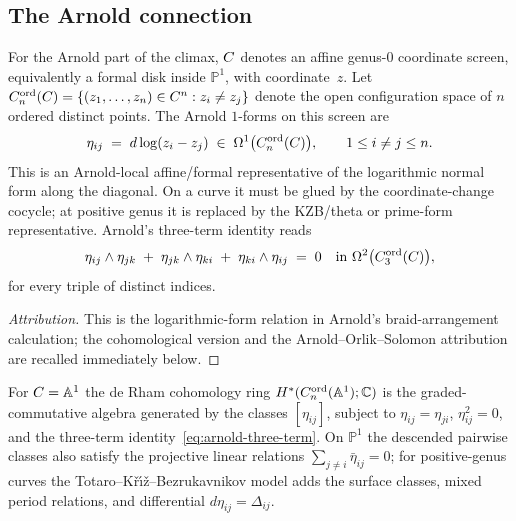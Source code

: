 \subsection{The Arnold connection}
\label{ssec:climax-platonic-arnold}

\begin{lemma}
\label{lem:arnold-three-term-forms-platonic}
For the Arnold part of the climax, $C$ denotes an affine
genus-$0$ coordinate screen, equivalently a formal disk inside
$\mathbb{P}^1$, with coordinate~$z$. Let
$C_n^{\mathrm{ord}}(C) = \{(z_1,\dots,z_n) \in C^{n}: z_i \neq z_j\}$
denote the open configuration space of $n$ ordered distinct points.
The Arnold $1$-forms on this screen are
\begin{equation}
\label{eq:arnold-eta}
 \eta_{ij} \;=\; d\log(z_i - z_j)
 \;\in\; \Omega^{1}\bigl(C_n^{\mathrm{ord}}(C)\bigr),
 \qquad 1 \leq i \neq j \leq n.
\end{equation}
This is an Arnold-local affine/formal representative of the
logarithmic normal form along the diagonal. On a curve it must be
glued by the coordinate-change cocycle; at positive genus it is
replaced by the KZB/theta or prime-form representative.
Arnold's three-term identity reads
\begin{equation}
\label{eq:arnold-three-term}
 \eta_{ij} \wedge \eta_{jk}
 \;+\; \eta_{jk} \wedge \eta_{ki}
 \;+\; \eta_{ki} \wedge \eta_{ij}
 \;=\; 0
 \quad\text{in }\Omega^{2}\bigl(C_3^{\mathrm{ord}}(C)\bigr),
\end{equation}
for every triple of distinct indices.
\end{lemma}

\begin{proof}[Attribution]
This is the logarithmic-form relation in Arnold's braid-arrangement
calculation; the cohomological version and the Arnold--Orlik--Solomon
attribution are recalled immediately below.
\end{proof}

\begin{theorem}[Arnold 1969]
\label{thm:arnold-cohomology-platonic}
\ClaimStatusProvedElsewhere
For $C=\mathbb{A}^1$ the de Rham cohomology ring
$H^{*}(C_n^{\mathrm{ord}}(\mathbb{A}^1);\mathbb{C})$ is the
graded-commutative algebra generated by the classes $[\eta_{ij}]$,
subject to $\eta_{ij}=\eta_{ji}$, $\eta_{ij}^{2}=0$, and the
three-term identity~\eqref{eq:arnold-three-term}. On
$\mathbb{P}^1$ the descended pairwise classes also satisfy the
projective linear relations
$\sum_{j\neq i}\bar\eta_{ij}=0$; for positive-genus curves the
Totaro--K\v{r}\'{\i}\v{z}--Bezrukavnikov model adds the surface
classes, mixed period relations, and differential
$d\eta_{ij}=\Delta_{ij}$.
\end{theorem}


